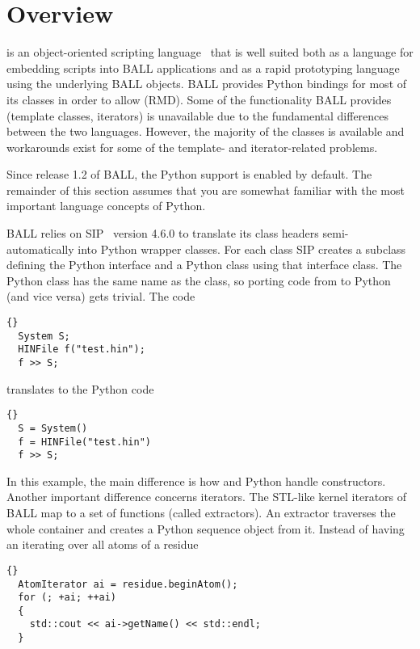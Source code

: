 \section{Overview}

 is an object-oriented scripting language~\cite{Python} that is 
well suited both as a language for embedding scripts into BALL applications and
as a rapid prototyping language using the underlying BALL objects.
BALL provides Python bindings for most of its classes in order to allow 
 (RMD). Some of the functionality BALL 
provides (\eg template classes, iterators) is unavailable due to the 
fundamental differences between the two languages. However, the majority of 
the classes is available and workarounds exist for some of the template- and 
iterator-related problems.

Since release 1.2 of BALL, the Python support is enabled by default. The 
remainder of this section assumes that you are somewhat familiar with the most
important language concepts of Python.

BALL relies on SIP~\cite{SIP}  version 4.6.0 to translate its class
headers semi-automatically into Python wrapper classes. For each \CPP class
SIP creates a subclass defining the Python interface and a Python class
using that \CPP interface class. The Python class has the same name as the
\CPP class, so porting code from \CPP to Python (and vice versa) gets trivial.
The \CPP code 

\begin{lstlisting}{}
  System S;
  HINFile f("test.hin");
  f >> S;
\end{lstlisting}

\noindent
translates to the Python code

\begin{lstlisting}{}
  S = System()
  f = HINFile("test.hin")
  f >> S;
\end{lstlisting}

\noindent
In this example, the main difference is how \CPP and Python handle
constructors. Another important difference concerns iterators. The STL-like
kernel iterators of BALL map to a set of functions (called extractors). An
extractor traverses the whole container and creates a Python sequence object
from it. Instead of having an  iterating over all atoms of
a residue

\begin{lstlisting}{}
  AtomIterator ai = residue.beginAtom();
  for (; +ai; ++ai)
  {
    std::cout << ai->getName() << std::endl;
  }
\end{lstlisting}

